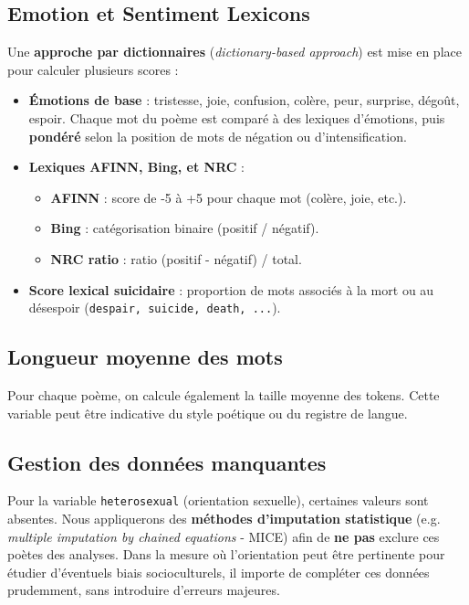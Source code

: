 \documentclass[12pt,a4paper]{article}
\begin{document}
	\subsection{Emotion et Sentiment Lexicons}
	Une \textbf{approche par dictionnaires} (\textit{dictionary-based approach}) 
	est mise en place pour calculer plusieurs scores :
	\begin{itemize}
		\item \textbf{Émotions de base} : tristesse, joie, confusion, colère, peur, 
		surprise, dégoût, espoir. Chaque mot du poème est comparé à des lexiques 
		d’émotions, puis \textbf{pondéré} selon la position de mots de négation 
		ou d’intensification.
		\item \textbf{Lexiques AFINN, Bing, et NRC} : 
		\begin{itemize}
			\item \textbf{AFINN} : score de -5 à +5 pour chaque mot (colère, joie, etc.).
			\item \textbf{Bing} : catégorisation binaire (positif / négatif).
			\item \textbf{NRC ratio} : ratio (positif - négatif) / total.
		\end{itemize}
		\item \textbf{Score lexical suicidaire} : proportion de mots associés à la mort 
		ou au désespoir (\texttt{despair, suicide, death, ...}).
	\end{itemize}
	
	\subsection{Longueur moyenne des mots}
	Pour chaque poème, on calcule également la taille moyenne des tokens. 
	Cette variable peut être indicative du style poétique ou du registre de langue.
	
	\subsection{Gestion des données manquantes}
	Pour la variable \texttt{heterosexual} (orientation sexuelle), certaines valeurs 
	sont absentes. Nous appliquerons des \textbf{méthodes d’imputation statistique} 
	(e.g. \textit{multiple imputation by chained equations} - MICE) afin de 
	\textbf{ne pas} exclure ces poètes des analyses. Dans la mesure où l’orientation 
	peut être pertinente pour étudier d’éventuels biais socioculturels, 
	il importe de compléter ces données prudemment, sans introduire d’erreurs majeures.
	
\end{document}
